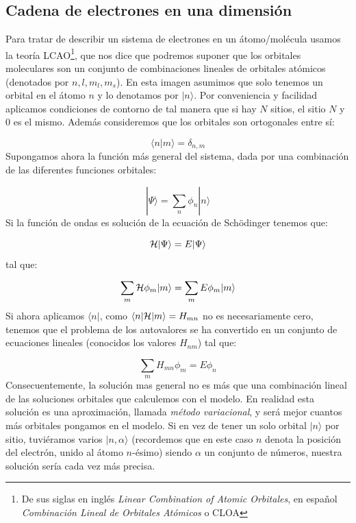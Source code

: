 \subsection{Cadena de electrones en una dimensión}

Para tratar de describir un sistema de electrones en un átomo/molécula usamos la teoría LCAO\footnote{De sus siglas en inglés \textit{Linear Combination of Atomic Orbitales}, en español \textit{Combinación Lineal de Orbitales Atómicos} o CLOA}, que nos dice que podremos suponer que los orbitales moleculares son un conjunto de combinaciones lineales de orbitales atómicos (denotados por $n,l,m_l,m_s$). En esta imagen asumimos que solo tenemos un orbital en el átomo $n$ y lo denotamos por $|n \rangle$. Por conveniencia y facilidad aplicamos condiciones de contorno de tal manera que si hay $N$ sitios, el sitio $N$ y $0$ es el mismo. Además consideremos que los orbitales son ortogonales entre sí:

\begin{equation}
	\langle n | m \rangle = \delta_{n,m}
\end{equation}
Supongamos ahora la función más general del sistema, dada por una combinación de las diferentes funciones orbitales:

\begin{equation}
	|\Psi \rangle = \sum_n \phi_n |n\rangle
\end{equation}
Si la función de ondas es solución de la ecuación de Schödinger tenemos que:

\begin{equation}
	\mathcal{H} |\Psi \rangle = E |\Psi \rangle 
\end{equation}
tal que:

\begin{equation}
	\sum_m \mathcal{H} \phi_m |m\rangle =  \sum_m E \phi_m |m\rangle
\end{equation}
Si ahora aplicamos $\langle n |$, como $\langle n| \mathcal{H} | m \rangle= H_{mn}$ no es necesariamente cero, tenemos que el problema de los autovalores se ha convertido en un conjunto de ecuaciones lineales (conocidos los valores $H_{nm}$) tal que:


\begin{equation}
	\sum_m H_{mn} \phi_m  =  E \phi_n \label{Ec:07-01-04}
\end{equation}
Consecuentemente, la solución mas general no es más que una combinación lineal de las soluciones orbitales que calculemos con el modelo. En realidad esta solución es una aproximación, llamada \textit{método variacional}, y será mejor cuantos más orbitales pongamos en el modelo. Si en vez de tener un solo orbital $|n\rangle$ por sitio, tuviéramos varios $|n,\alpha\rangle$ (recordemos que en este caso $n$ denota la posición del electrón, unido al átomo $n$-ésimo) siendo $\alpha$ un conjunto de números, nuestra solución sería cada vez más precisa.

